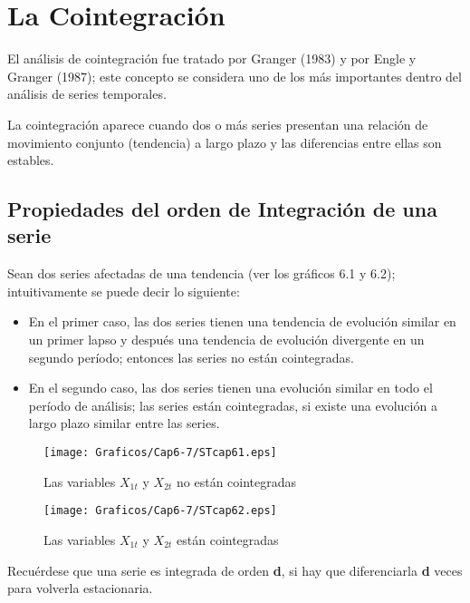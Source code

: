 \chapter{La Cointegraci\'{o}n}

El an\'{a}lisis de cointegraci\'{o}n fue tratado por Granger (1983) y por Engle y Granger (1987); este concepto se considera uno de los m\'{a}s importantes dentro del an\'{a}lisis de series temporales.\newline

La cointegraci\'{o}n aparece cuando dos o m\'{a}s series presentan una relaci\'{o}n de movimiento conjunto (tendencia) a largo plazo y las diferencias entre ellas son estables. 

\section{Propiedades del orden de Integraci\'{o}n de una serie}
Sean dos series afectadas de una tendencia (ver los gr\'{a}ficos 6.1 y 6.2); intuitivamente se puede decir lo siguiente:
\begin{itemize}
      \item En el primer caso, las dos series tienen una tendencia de evoluci\'{o}n similar en un primer lapso y despu\'{e}s una tendencia de evoluci\'{o}n divergente en un segundo per\'{i}odo; entonces las series no est\'{a}n cointegradas.
      \item En el segundo caso, las dos series tienen una evoluci\'{o}n similar en todo el per\'{i}odo de an\'{a}lisis; las series est\'{a}n cointegradas, si existe una evoluci\'{o}n a largo plazo similar entre las series.
\end{itemize}

\begin{figure}[H]
\centering
\texttt{[image: Graficos/Cap6-7/STcap61.eps]}
\caption{Las variables $X_{1t}$ y $X_{2t}$ no est\'{a}n cointegradas}
\end{figure}

\begin{figure}[H]
\centering
\texttt{[image: Graficos/Cap6-7/STcap62.eps]}
\caption{Las variables $X_{1t}$ y $X_{2t}$ est\'{a}n cointegradas}
\end{figure}

Recu\'{e}rdese que una serie es integrada de orden \textbf{d}, si hay que diferenciarla \textbf{d} veces para volverla estacionaria.\newline

